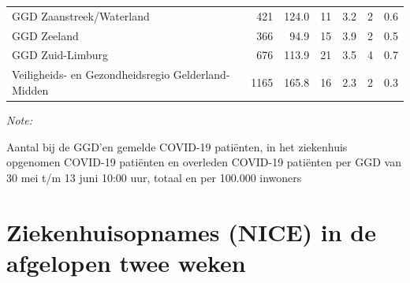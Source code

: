 \documentclass[
  english,
  man,floatsintext]{apa6}
\begin{document}
\begin{table}
\begin{threeparttable}
\begin{tabular}{lrrrrrr}
GGD Zaanstreek/Waterland & 421 & 124.0 & 11 & 3.2 & 2 & 0.6\\
GGD Zeeland & 366 & 94.9 & 15 & 3.9 & 2 & 0.5\\
GGD Zuid-Limburg & 676 & 113.9 & 21 & 3.5 & 4 & 0.7\\
Veiligheids- en Gezondheidsregio Gelderland-Midden & 1165 & 165.8 & 16 & 2.3 & 2 & 0.3\\
\bottomrule
\end{tabular}
\begin{tablenotes}
\item \textit{Note: } 
\item Aantal bij de GGD’en gemelde COVID-19 patiënten, in het ziekenhuis opgenomen COVID-19 patiënten en overleden COVID-19 patiënten per GGD van 30 mei t/m 13 juni 10:00 uur, totaal en per 100.000 inwoners
\end{tablenotes}
\end{threeparttable}
\endgroup{}
\end{table}

\newpage

\hypertarget{ziekenhuisopnames-nice-in-de-afgelopen-twee-weken}{%
\section{Ziekenhuisopnames (NICE) in de afgelopen twee weken}\label{ziekenhuisopnames-nice-in-de-afgelopen-twee-weken}}
\end{document}
